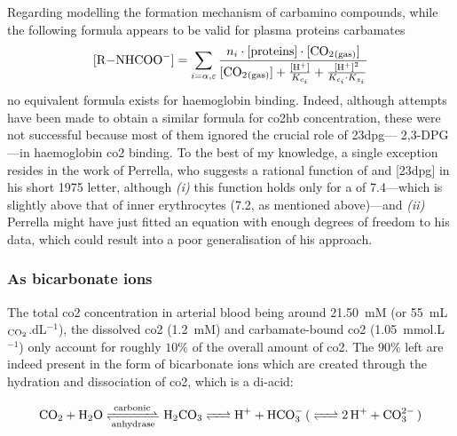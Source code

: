 Regarding modelling the formation mechanism of carbamino compounds, while the following formula appears to be valid for plasma proteins carbamates\cite{klocke1987}
\begin{equation}
	\ce{[R-NHCOO^-]} = \sum_{i=\alpha, \varepsilon} \frac{n_i \cdot [\text{proteins}] \cdot \ce{[CO2_{(gas)}]}}{\ce{[CO2_{(gas)}]} + \frac{\ce{[H+]}}{K_{c_i}} + \frac{\ce{[H+]}^2}{K_{c_i} \cdot K_{z_i}} }
\end{equation}
no equivalent formula exists for haemoglobin binding. Indeed, although attempts have been made to obtain a similar formula for \gls{co2hb} concentration, these were not successful because most of them ignored the crucial role of \gls{23dpg}---\aka{} 2,3-DPG---in haemoglobin \gls{co2} binding\cite{gros1981, klocke1987}. To the best of my knowledge, a single exception resides in the work of Perrella,  who suggests a rational function of \ce{[CO2_{(gas)}]} and [\gls{23dpg}] in his short 1975 letter\cite{perrella1975a}, although \emph{(i)} this function holds only for a \pH{} of 7.4---which is slightly above that of inner erythrocytes (7.2, as mentioned above)---and \emph{(ii)} Perrella might have just fitted an equation with enough degrees of freedom to his data, which could result into a poor generalisation of his approach.

\subsubsection{As bicarbonate ions}\label{subsect:co2hb:bicarb}

The total \gls{co2} concentration in arterial blood being around 21.50~mM (or 55~mL$_{\ce{CO_2}}$.dL$^{-1}$), the dissolved \gls{co2} (1.2~mM) and carbamate-bound \gls{co2} (1.05~mmol.L$^{-1}$) only account for roughly $10\%$ of the overall amount of \gls{co2}\cite{geers2000}. The $90\%$ left are indeed present in the form of bicarbonate ions which are created through the hydration and dissociation of \gls{co2}, which is a di-acid:

\begin{equation}\label{eq:co2hb:carb_disso}
	\ce{CO2 + H2O <=>T[carbonic][anhydrase] H2CO3 <=> H+ + HCO^-_3 ( <=> 2H+ + CO^2-_3 )}
\end{equation}

